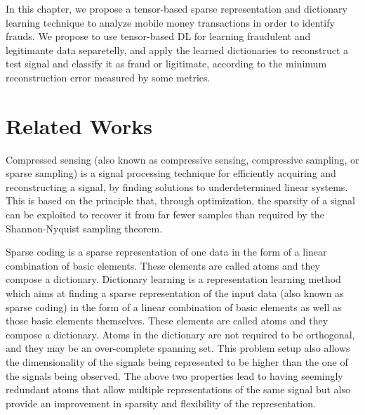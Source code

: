 In this chapter, we propose a tensor-based sparse representation and dictionary learning technique to analyze mobile money transactions in order to identify frauds. We propose to use tensor-based DL for learning fraudulent and legitimante data separetelly, and apply the learned dictionaries to reconstruct a test signal and classify it as fraud or ligitimate, according to the minimum reconstruction error measured by some metrics.


\section{Related Works}
\label{sec:4_relatedworks}


Compressed sensing (also known as compressive sensing, compressive sampling, or sparse sampling) is a signal processing technique for efficiently acquiring and reconstructing a signal, by finding solutions to underdetermined linear systems. This is based on the principle that, through optimization, the sparsity of a signal can be exploited to recover it from far fewer samples than required by the Shannon-Nyquist sampling theorem. 


Sparse coding is a sparse representation of one data in the form of a linear combination of basic elements. These elements are called atoms and they compose a dictionary. Dictionary learning is a representation learning method which aims at finding a sparse representation of the input data (also known as sparse coding) in the form of a linear combination of basic elements as well as those basic elements themselves. These elements are called atoms and they compose a dictionary. Atoms in the dictionary are not required to be orthogonal, and they may be an over-complete spanning set. This problem setup also allows the dimensionality of the signals being represented to be higher than the one of the signals being observed. The above two properties lead to having seemingly redundant atoms that allow multiple representations of the same signal but also provide an improvement in sparsity and flexibility of the representation.


